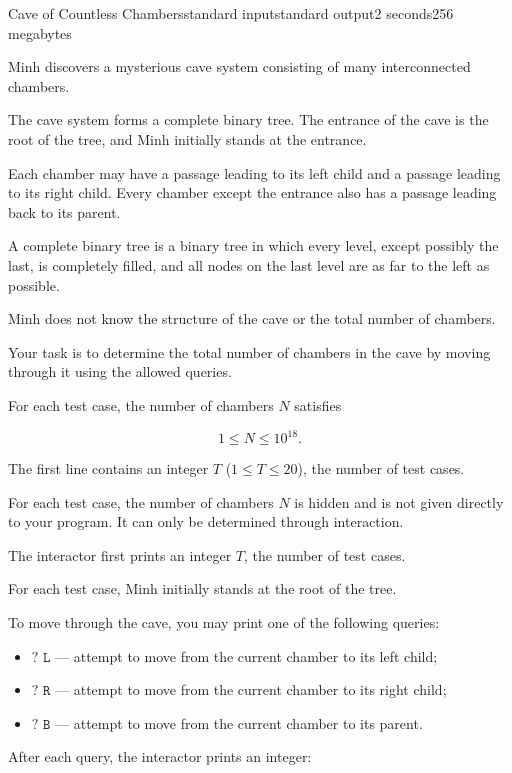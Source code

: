 \begin{problem}{Cave of Countless Chambers}{standard input}{standard output}{2 seconds}{256 megabytes}

Minh discovers a mysterious cave system consisting of many interconnected chambers.

The cave system forms a complete binary tree. The entrance of the cave is the root of the tree, and Minh initially stands at the entrance.

Each chamber may have a passage leading to its left child and a passage leading to its right child. Every chamber except the entrance also has a passage leading back to its parent.

A complete binary tree is a binary tree in which every level, except possibly the last, is completely filled, and all nodes on the last level are as far to the left as possible.

Minh does not know the structure of the cave or the total number of chambers.

Your task is to determine the total number of chambers in the cave by moving through it using the allowed queries.

For each test case, the number of chambers $N$ satisfies

$$1 \le N \le 10^{18}.$$

\InputFile
The first line contains an integer $T$ ($1 \le T \le 20$), the number of test cases.

For each test case, the number of chambers $N$ is hidden and is not given directly to your program. It can only be determined through interaction.

\Interaction
The interactor first prints an integer $T$, the number of test cases.

For each test case, Minh initially stands at the root of the tree.

To move through the cave, you may print one of the following queries:

\begin{itemize}
\item $\texttt{? L}$ --- attempt to move from the current chamber to its left child;
\item $\texttt{? R}$ --- attempt to move from the current chamber to its right child;
\item $\texttt{? B}$ --- attempt to move from the current chamber to its parent.
\end{itemize}

After each query, the interactor prints an integer:


\end{problem}
